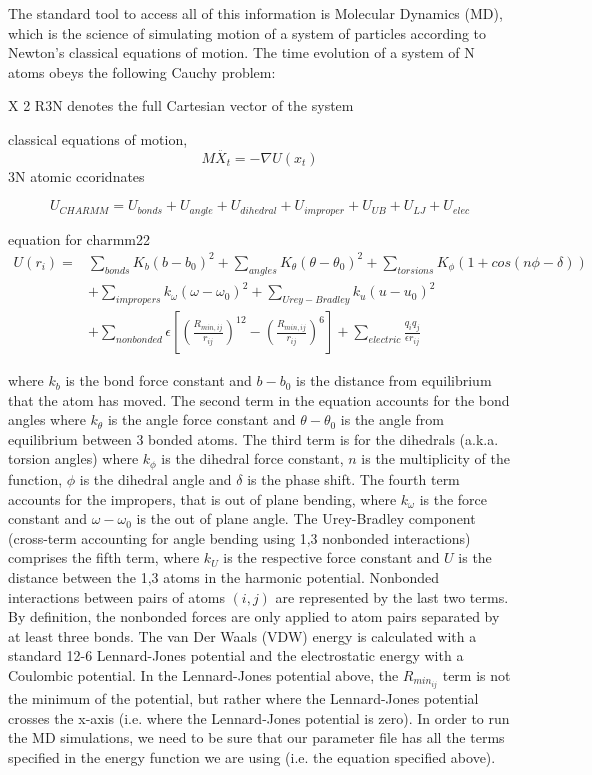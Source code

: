 The standard tool to access all of this information is Molecular Dynamics (MD), which is
the science of simulating motion of a system of particles according to Newton’s classical
equations of motion.
The time evolution of a system of N atoms obeys the following Cauchy problem:

X 2 R3N denotes the full Cartesian vector of the system

classical equations of motion,
$$M\ddot{X_{t}}=-\nabla U(x_{t})$$
3N atomic ccoridnates

$$U_{CHARMM}=U_{bonds}+U_{angle}+U_{dihedral}+U_{improper}+U_{UB}+U_{LJ}+U_{elec}$$

equation for charmm22
\begin{equation}
\begin{aligned}
U(r_{i})={} &\sum_{bonds}K_{b}(b-b_{0})^{2}+\sum_{angles}K_{\theta}(\theta-\theta_{0})^{2}+\sum_{torsions}K_{\phi}\left(1+cos(n\phi-\delta)\right)\\
&+\sum_{impropers}k_{\omega}\left(\omega-\omega_{0}\right)^{2}+\sum_{Urey-Bradley}k_{u}\left(u-u_{0}\right)^{2}\\
&+\sum_{nonbonded}\epsilon\left[\left(\frac{R_{min,ij}}{r_{ij}}\right)^{12}-\left(\frac{R_{min,ij}}{r_{ij}}\right)^{6}\right]+\sum_{electric}\frac{q_{i}q_{j}}{\epsilon r_{ij}}
\end{aligned}
\end{equation}

where $k_b$ is the bond force constant and $b-b_0$ is the distance from equilibrium that the atom has moved. The second term in the equation accounts for the bond angles where $k_\theta$ is the angle force constant and $\theta-\theta_0$ is the angle from equilibrium between 3 bonded atoms. The third term is for the dihedrals (a.k.a. torsion angles) where $k_\phi$ is the dihedral force constant, $n$ is the multiplicity of the function, $\phi$ is the dihedral angle and $\delta$ is the phase shift. The fourth term accounts for the impropers, that is out of plane bending, where $k_\omega$ is the force constant and $\omega-\omega_0$ is the out of plane angle. The Urey-Bradley component (cross-term accounting for angle bending using 1,3 nonbonded interactions) comprises the fifth term, where $k_U$ is the respective force constant and $U$ is the distance between the 1,3 atoms in the harmonic potential. Nonbonded interactions between pairs of atoms $(i,j)$ are represented by the last two terms. By definition, the nonbonded forces are only applied to atom pairs separated by at least three bonds. The van Der Waals (VDW) energy is calculated with a standard 12-6 Lennard-Jones potential and the electrostatic energy with a Coulombic potential. In the Lennard-Jones potential above, the $R_{{min}_{ij}}$ term is not the minimum of the potential, but rather where the Lennard-Jones potential crosses the x-axis (i.e. where the Lennard-Jones potential is zero). In order to run the MD simulations, we need to be sure that our parameter file has all the terms specified in the energy function we are using (i.e. the equation specified above). 


